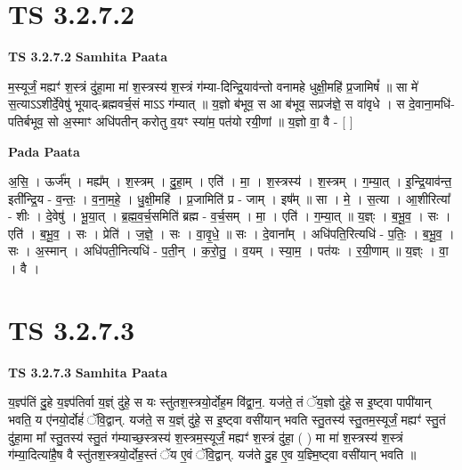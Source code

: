 \documentclass[17pt]{extarticle}
\begin{document}

\section{ TS 3.2.7.2 }

\textbf{TS 3.2.7.2 } \newline
\textbf{Samhita Paata} \newline

म॒स्यूर्जं॒ मह्यꣳ॑ श॒स्त्रं दु॑हा॒मा मा॑ श॒स्त्रस्य॑ श॒स्त्रं ग॑म्या-दिन्द्रि॒याव॑न्तो वनामहे धुक्षी॒महि॑ प्र॒जामिषं᳚ ॥ सा मे॑ स॒त्याऽऽशीर्दे॒वेषु॑ भूयाद्-ब्रह्मवर्च॒सं माऽऽ ग॑म्यात् ॥ य॒ज्ञो ब॑भूव॒ स आ ब॑भूव॒ सप्रज॑ज्ञे॒ स वा॑वृधे । स दे॒वाना॒मधि॑-पतिर्बभूव॒ सो अ॒स्माꣳ अधि॑पतीन् करोतु व॒यꣳ स्या॑म॒ पत॑यो रयी॒णां ॥ य॒ज्ञो वा॒ वै - [  ] \newline

\textbf{Pada Paata} \newline

अ॒सि॒ । ऊर्ज᳚म् । मह्य᳚म् । श॒स्त्रम् । दु॒हा॒म् । एति॑ । मा॒ । श॒स्त्रस्य॑ । श॒स्त्रम् । ग॒म्या॒त् । इ॒न्द्रि॒याव॑न्त॒ इती᳚न्द्रि॒य - व॒न्तः॒ । व॒ना॒म॒हे॒ । धु॒क्षी॒महि॑ । प्र॒जामिति॑ प्र - जाम् । इष᳚म् ॥ सा । मे॒ । स॒त्या । आ॒शीरित्या᳚ - शीः । दे॒वेषु॑ । भू॒या॒त् । ब्र॒ह्म॒व॒र्च॒समिति॑ ब्रह्म - व॒र्च॒सम् । मा॒ । एति॑ । ग॒म्या॒त् ॥ य॒ज्ञ्ः । ब॒भू॒व॒ । सः । एति॑ । ब॒भू॒व॒ । सः । प्रेति॑ । ज॒ज्ञे॒ । सः । वा॒वृ॒धे॒ ॥ सः । दे॒वाना᳚म् । अधि॑पति॒रित्यधि॑ - प॒तिः॒ । ब॒भू॒व॒ । सः । अ॒स्मान् । अधि॑पती॒नित्यधि॑ - प॒ती॒न् । क॒रो॒तु॒ । व॒यम् । स्या॒म॒ । पत॑यः । र॒यी॒णाम् ॥ य॒ज्ञ्ः । वा॒ । वै ।  \newline





\section{ TS 3.2.7.3 }

\textbf{TS 3.2.7.3 } \newline
\textbf{Samhita Paata} \newline

य॒ज्ञ्प॑तिं दु॒हे य॒ज्ञ्प॑तिर्वा य॒ज्ञ्ं दु॑हे॒ स यः स्तु॑तश॒स्त्रयो॒र्दोह॒म वि॑द्वा॒न॒. यज॑ते॒ तं ॅय॒ज्ञो दु॑हे॒ स इ॒ष्ट्वा पापी॑यान् भवति॒ य ए॑नयो॒र्दोहं॑ ॅवि॒द्वान्. यज॑ते॒ स य॒ज्ञ्ं दु॑हे॒ स इ॒ष्ट्वा वसी॑यान् भवति स्तु॒तस्य॑ स्तु॒तम॒स्यूर्जं॒ मह्यꣳ॑ स्तु॒तं दु॑हा॒मा मा᳚ स्तु॒तस्य॑ स्तु॒तं ग॑म्याच्छ॒स्त्रस्य॑ श॒स्त्रम॒स्यूर्जं॒ मह्यꣳ॑ श॒स्त्रं दु॑हा॒ ( ) मा मा॑ श॒स्त्रस्य॑ श॒स्त्रं ग॑म्या॒दित्या॑है॒ष वै स्तु॑तश॒स्त्रयो॒र्दोह॒स्तं ॅय ए॒वं ॅवि॒द्वान्. यज॑ते दु॒ह ए॒व य॒ज्ञ्मि॒ष्ट्वा वसी॑यान् भवति ॥ \newline
\end{document}

